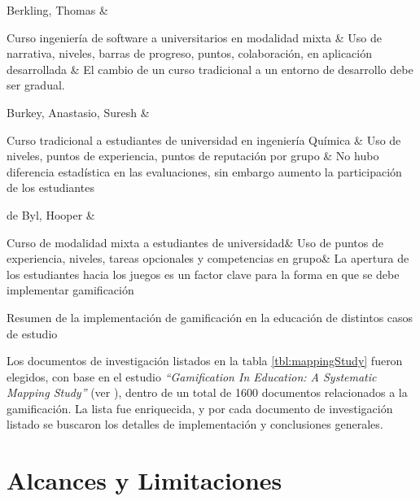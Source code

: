 {        Berkling, Thomas \cite{gamificationFailure} &

            Curso ingeniería de software a universitarios en modalidad mixta &
            Uso de narrativa, niveles, barras de progreso, puntos, colaboración,
            en aplicación desarrollada &
            El cambio de un curso tradicional a un entorno de desarrollo
            debe ser gradual.\\\hline


        Burkey, Anastasio, Suresh \cite{gamificationChemical} &

            Curso tradicional a estudiantes de universidad en ingeniería Química &
            Uso de niveles, puntos de experiencia, puntos de reputación por grupo &
            No hubo diferencia estadística en las evaluaciones, sin embargo aumento la participación de los estudiantes\\\hline


        de Byl, Hooper \cite{gamifiedLearningKeyAttributes} &

            Curso de modalidad mixta a estudiantes de universidad&
            Uso de puntos de experiencia, niveles, tareas opcionales
            y competencias en grupo&
            La apertura de los estudiantes hacia los juegos es un factor
            clave para la forma en que se debe implementar gamificación\\\hline


    }{Resumen de la implementación de gamificación en la educación
      de distintos casos de estudio}

 \noindent Los documentos de investigación listados en la tabla \ref{tbl:mappingStudy}
 fueron elegidos, con base en el estudio {\em ``Gamification In Education: A 
 Systematic Mapping Study''} (ver \cite{mappingStudy}), dentro de un total de 1600 
 documentos relacionados a la gamificación. La lista fue enriquecida, y por cada 
 documento de investigación listado se buscaron los detalles de implementación y 
 conclusiones generales.

\section{Alcances y Limitaciones} \label{sec:alcancesLimitaciones}

